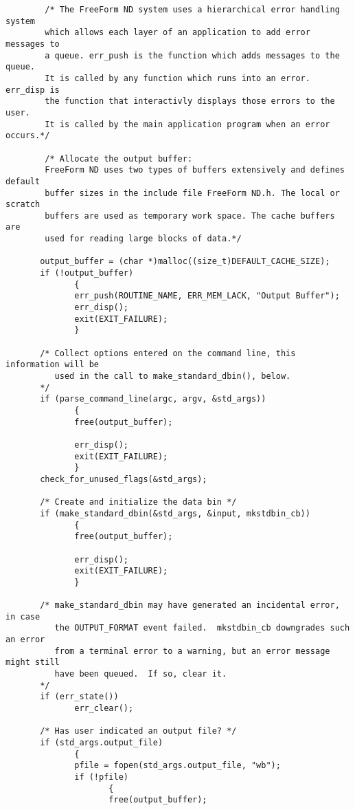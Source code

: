 \begin{verbatim}
        /* The FreeForm ND system uses a hierarchical error handling system
        which allows each layer of an application to add error messages to
        a queue. err_push is the function which adds messages to the queue.
        It is called by any function which runs into an error. err_disp is
        the function that interactivly displays those errors to the user.
        It is called by the main application program when an error occurs.*/
            
        /* Allocate the output buffer:
        FreeForm ND uses two types of buffers extensively and defines default
        buffer sizes in the include file FreeForm ND.h. The local or scratch
        buffers are used as temporary work space. The cache buffers are
        used for reading large blocks of data.*/
     
       output_buffer = (char *)malloc((size_t)DEFAULT_CACHE_SIZE);
       if (!output_buffer)
              {
              err_push(ROUTINE_NAME, ERR_MEM_LACK, "Output Buffer");
              err_disp();
              exit(EXIT_FAILURE);
              }
     
       /* Collect options entered on the command line, this information will be
          used in the call to make_standard_dbin(), below.
       */
       if (parse_command_line(argc, argv, &std_args))
              {
              free(output_buffer);

              err_disp();
              exit(EXIT_FAILURE);
              }
       check_for_unused_flags(&std_args);

       /* Create and initialize the data bin */
       if (make_standard_dbin(&std_args, &input, mkstdbin_cb))
              {
              free(output_buffer);

              err_disp();
              exit(EXIT_FAILURE);
              }
       
       /* make_standard_dbin may have generated an incidental error, in case 
          the OUTPUT_FORMAT event failed.  mkstdbin_cb downgrades such an error 
          from a terminal error to a warning, but an error message might still 
          have been queued.  If so, clear it.
       */
       if (err_state())
              err_clear();
       
       /* Has user indicated an output file? */
       if (std_args.output_file)
              {
              pfile = fopen(std_args.output_file, "wb");
              if (!pfile)
                     {
                     free(output_buffer);


\end{verbatim}
